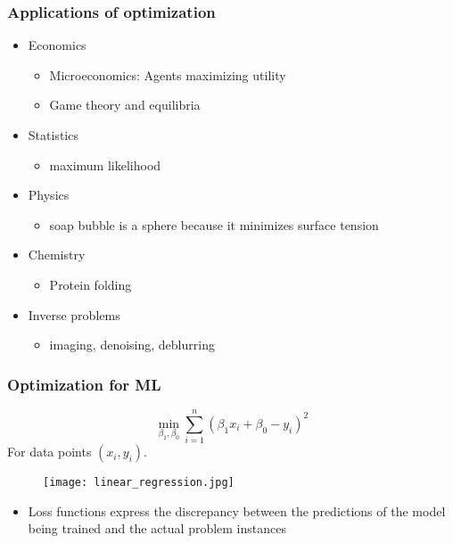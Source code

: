 \documentclass{beamer}
\begin{document}
\begin{frame}
  \frametitle{Applications of optimization}

  \begin{itemize}
    \item Economics
          \begin{itemize}
            \item Microeconomics: Agents maximizing utility
            \item Game theory and equilibria
          \end{itemize}
    \item Statistics
          \begin{itemize}
            \item maximum likelihood
          \end{itemize}
    \item Physics
          \begin{itemize}
            \item soap bubble is a sphere because it minimizes surface tension
          \end{itemize}
    \item Chemistry
          \begin{itemize}
            \item Protein folding
          \end{itemize}
    \item Inverse problems
          \begin{itemize}
            \item imaging, denoising, deblurring
          \end{itemize}
  \end{itemize}

\end{frame}

\begin{frame}
  \frametitle{Optimization for ML}
  \begin{minipage}{0.5\textwidth}
    \begin{equation}
      \min_{\beta_1, \beta_0} \sum_{i=1}^{n} {( \beta_1 x_i + \beta_0 - y_i)}^2
    \end{equation}
    For data points $(x_i, y_i)$.
  \end{minipage}
  \hfill
  \begin{minipage}{0.45\textwidth}
    \begin{figure}[ht]
      \centering
      \texttt{[image: linear\_regression.jpg]}
    \end{figure}
  \end{minipage}

  \begin{itemize}
    \item Loss functions express the discrepancy between the predictions of the model being trained and the actual problem instances
  \end{itemize}
\end{frame}
\end{document}
